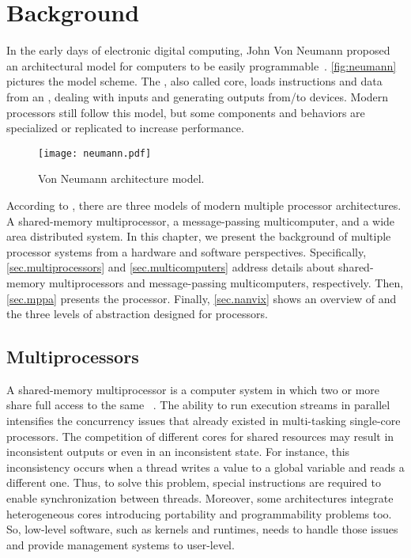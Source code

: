 \chapter{Background}
\label{ch.background}

	In the early days of electronic digital computing, John Von Neumann
	proposed an architectural model for computers to be easily programmable~\cite{von-neumann:model}.
	\autoref{fig:neumann} pictures the model scheme.
	The \cpu, also called core, loads instructions and data from an \mmu,
	dealing with inputs and generating outputs from/to \io devices.
	Modern processors still follow this model, but some components and
	behaviors are specialized or replicated to increase performance.

	\begin{figure}[!tb]
		\centering%
		\caption{Von Neumann architecture model.}%
		\label{fig:neumann}%
		\texttt{[image: neumann.pdf]}%
	\end{figure}
	
	According to , there are three models of
	modern multiple processor architectures.
	A shared-memory multiprocessor, a message-passing multicomputer, and a wide
	area distributed system.
	In this chapter, we present the background of multiple processor systems from
	a hardware and software perspectives.
	Specifically, \autoref{sec.multiprocessors} and \autoref{sec.multicomputers} address
	details about shared-memory multiprocessors and message-passing multicomputers, respectively.
	Then, \autoref{sec.mppa} presents the \mppa processor.
	Finally, \autoref{sec.nanvix} shows an overview of \nanvixos and the
	three levels of abstraction designed for \lightweight \manycores processors.

	\section{Multiprocessors}
	\label{sec.multiprocessors}

		A shared-memory multiprocessor is a computer system in which two or more \cpus
		share full access to the same \ram~\cite{tanenbaum:4ed}.
		The ability to run execution streams in parallel intensifies the concurrency
		issues that already existed in multi-tasking single-core processors.
		The competition of different cores for shared resources may result in
		inconsistent outputs or even in an inconsistent \os state.
		For instance, this inconsistency occurs when a thread writes a value to a global variable and
		reads a different one. Thus, to solve this problem, special
		instructions are required to enable synchronization between
		threads.
		Moreover, some architectures integrate heterogeneous cores introducing
		portability and programmability problems too.
		So, low-level software, such as \os kernels and runtimes, needs to handle
		those issues and provide management systems to user-level.

